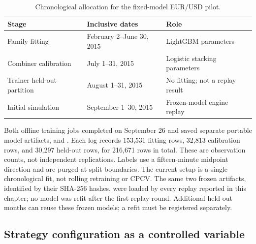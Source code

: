 \begin{table}[htbp]
\centering
\caption{Chronological allocation for the fixed-model EUR/USD pilot.}
\label{tab:pilot-splits}
\small
\begin{tabular}{p{4.0cm}p{4.0cm}p{5.0cm}}
\toprule
\textbf{Stage} & \textbf{Inclusive dates} & \textbf{Role} \\
\midrule
Family fitting & February 2--June 30, 2015 & LightGBM parameters \\
Combiner calibration & July 1--31, 2015 & Logistic stacking parameters \\
Trainer held-out partition & August 1--31, 2015 & No fitting; not a replay result \\
Initial simulation & September 1--30, 2015 & Frozen-model engine replay \\
\bottomrule
\end{tabular}
\end{table}

Both offline training jobs completed on September 26 and saved separate portable model artifacts,  and . Each log records 153,531 fitting rows, 32,813 calibration rows, and 30,297 held-out rows, for 216,671 rows in total. These are observation counts, not independent replications. Labels use a fifteen-minute midpoint direction and are purged at split boundaries. The current setup is a single chronological fit, not rolling retraining or CPCV. The same two frozen artifacts, identified by their SHA-256 hashes, were loaded by every replay reported in this chapter; no model was refit after the first replay round. Additional held-out months can reuse these frozen models; a refit must be registered separately.

\subsection{Strategy configuration as a controlled variable} \label{subsec:strategy-config}

